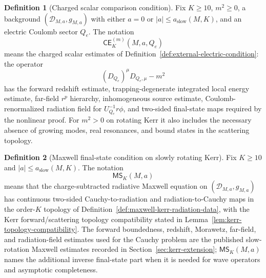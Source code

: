 \documentclass[11pt]{article}
\numberwithin{equation}{section}
\theoremstyle{plain}
\theoremstyle{definition}
\newtheorem{definition}{Definition}[section]
\theoremstyle{remark}
\newcommand{\CElec}{\mathsf{CE}}
\newcommand{\MScat}{\mathsf{MS}}
\begin{document}
\begin{definition}[Charged scalar comparison condition]\label{def:electric-charged-condition-main}
Fix \(K\ge10\), \(m^2\ge0\), a background \((\mathcal D_{M,a},g_{M,a})\) with either \(a=0\) or \(|a|\le a_{\mathrm{slow}}(M,K)\), and an electric Coulomb sector \(Q_e\).  The notation
\begin{equation}\label{eq:celec-symbol-main}
 \CElec^{(m)}_K(M,a,Q_e)
\end{equation}
means the charged scalar estimates of Definition~\ref{def:external-electric-condition}: the operator
\begin{equation}\label{eq:celec-operator-main}
 (D_{Q_e})^{\mu} D_{Q_e,\mu}-m^2
\end{equation}
has the forward redshift estimate, trapping-degenerate integrated local energy estimate, far-field \(r^p\) hierarchy, inhomogeneous source estimate, Coulomb-renormalized radiation field for \(U_{Q_e}^{-1}r\phi\), and two-sided final-state maps required by the nonlinear proof.  For \(m^2>0\) on rotating Kerr it also includes the necessary absence of growing modes, real resonances, and bound states in the scattering topology.
\end{definition}


\begin{definition}[Maxwell final-state condition on slowly rotating Kerr]\label{def:maxwell-final-state-condition}
Fix \(K\ge10\) and \(|a|\le a_{\mathrm{slow}}(M,K)\).  The notation
\begin{equation}\label{eq:maxwell-final-state-symbol}
 \MScat_K(M,a)
\end{equation}
means that the charge-subtracted radiative Maxwell equation on \((\mathcal D_{M,a},g_{M,a})\) has continuous two-sided Cauchy-to-radiation and radiation-to-Cauchy maps in the order-\(K\) topology of Definition~\ref{def:maxwell-kerr-radiation-data}, with the Kerr forward/scattering topology compatibility stated in Lemma~\ref{lem:kerr-topology-compatibility}.  The forward boundedness, redshift, Morawetz, far-field, and radiation-field estimates used for the Cauchy problem are the published slow-rotation Maxwell estimates recorded in Section~\ref{sec:kerr-extension}; \(\MScat_K(M,a)\) names the additional inverse final-state part when it is needed for wave operators and asymptotic completeness.
\end{definition}
\end{document}
